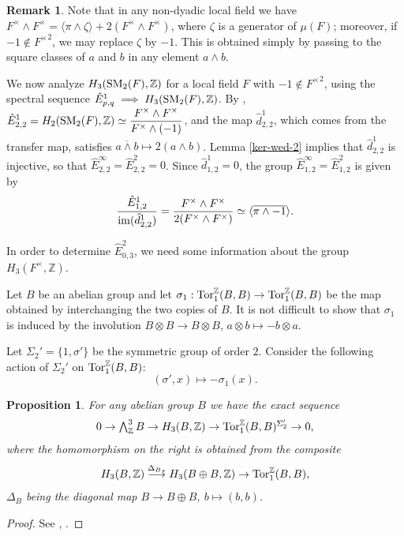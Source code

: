 \documentclass[11pt]{amsart}
\theoremstyle{definition}
\theoremstyle{plain}
\newtheorem{prp}[ntn]{Proposition}
\theoremstyle{definition}
\newtheorem{rem}[ntn]{Remark}
\numberwithin{equation}{section}
\newcommand{\z}{\mathbb{Z}}
\newcommand{\tors}{{{\rm Tor}_1^{\z}}}
\newcommand{\lan}{\langle}
\newcommand{\ran}{\rangle}
\newcommand{\arr}{\rightarrow}
\newcommand{\larr}{\longrightarrow}
\newcommand{\SM}{\mathit{{\rm SM}}}
\newcommand{\im}{{\rm im}}
\begin{document}
	\begin{rem}
		\label{lf-classes}
		Note that in any non-dyadic local field we have $F^\times\wedge F^\times=\lan\pi\wedge\zeta\ran+2(F^\times\wedge F^\times)$, where $\zeta$ is a generator of $\mu(F)$; moreover, if $-1\notin {F^\times}^2$, we may replace $\zeta$ by $-1$. This is obtained simply by passing to the square classes of $a$ and $b$ in any element $a\wedge b$.
	\end{rem}
	
	We now analyze $H_3(\SM_2(F),\z)$ for a local field $F$ with $-1\notin {F^\times}^2$, using the spectral sequence $\hat{E}^1_{p,q}\implies H_3(\SM_2(F),\z)$. By \cite[Lemma 5.1]{B-E--2023}, $\displaystyle \hat{E}^1_{2,2}=H_2(\SM_2(F),\z)\simeq\frac{F^\times\wedge F^\times}{F^\times\wedge(-1)}$, and the map $\hat{d}^1_{2,2}$, which comes from the transfer map, satisfies $\overline{a\wedge b}\mapsto 2(a\wedge b)$. Lemma \ref{ker-wed-2} implies that $\hat{d}^1_{2,2}$ is injective, so that $\hat{E}^{\infty}_{2,2}=\hat{E}^2_{2,2}=0$. Since $\hat{d}^1_{1,2}=0$, the group $\hat{E}^{\infty}_{1,2}=\hat{E}^2_{1,2}$ is given by 
	\[
	\frac{\hat{E}^1_{1,2}}{\im(\hat{d}^1_{2,2})}=\frac{F^\times\wedge F^\times}{2(F^\times\wedge F^\times)}\simeq\lan\overline{\pi\wedge-1}\ran.
	\]
	
	In order to determine $\hat{E}^2_{0,3}$, we need some information about the group $H_3(F^\times,\z)$.
	
	Let $B$ be an abelian group and let $\sigma_1:\tors(B,B)\arr \tors(B,B)$
	be the map obtained by interchanging the two copies of $B$. It is not difficult to show that $\sigma_1$ is induced by
	the involution $B\otimes B \arr B\otimes B$, $a\otimes b\mapsto -b\otimes a$.
	
	Let $\Sigma_2'=\{1, \sigma'\}$ be the symmetric group of order $2$. Consider the following action of 
	$\Sigma_2'$ on $\tors(B,B)$:
	\[
	(\sigma', x)\mapsto -\sigma_1(x).
	\]
	
	\begin{prp}\label{H3B}
		For any abelian group $B$ we have the exact sequence
		\[
		\begin{array}{c}
			0 \arr \bigwedge_\z^3 B \arr H_3(B,\z) \arr \tors(B,B)^{\Sigma_2'} \arr 0,
		\end{array}
		\]
		where the homomorphism on the right is obtained from the composite
		\[
		H_3(B,\z) \overset{{\Delta_B}_\ast}{\larr } H_3(B\oplus B,\z) \arr \tors(B,B),
		\]
		$\Delta_B$ being the diagonal map $B \arr B\oplus B$, $b \mapsto (b,b)$.
	\end{prp}
	\begin{proof}
		See \cite[Lemma~5.5]{suslin1991}, \cite[Section 6]{breen1999}.
	\end{proof}
	
\end{document}
